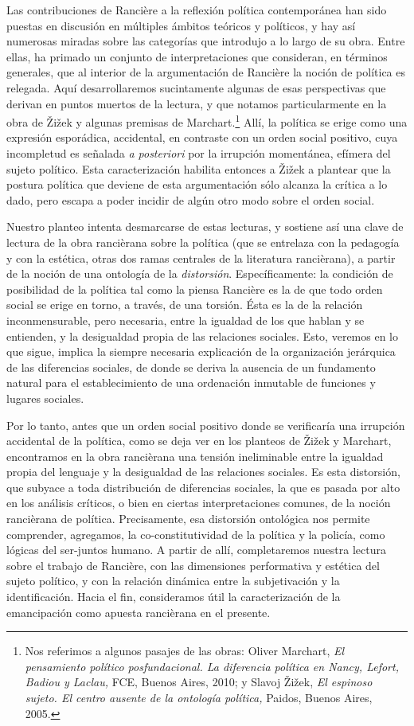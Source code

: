 Las contribuciones de Rancière a la reflexión política contemporánea han sido puestas en discusión en múltiples ámbitos teóricos y políticos, y hay así numerosas miradas sobre las categorías que introdujo a lo largo de su obra. Entre ellas, ha primado un conjunto de interpretaciones que consideran, en términos generales, que al interior de la argumentación de Rancière la noción de política es relegada. Aquí desarrollaremos sucintamente algunas de esas perspectivas que derivan en puntos muertos de la lectura, y que notamos particularmente en la obra de Žižek y algunas premisas de Marchart.\footnote{Nos referimos a algunos pasajes de las obras: Oliver Marchart, \emph{El pensamiento político posfundacional. La diferencia política en Nancy, Lefort, Badiou y Laclau,} FCE, Buenos Aires, 2010; y Slavoj Žižek, \emph{El espinoso sujeto. El centro ausente de la ontología política,} Paidos, Buenos Aires, 2005.} Allí, la política se erige como una expresión esporádica, accidental, en contraste con un orden social positivo, cuya incompletud es señalada \emph{a posteriori} por la irrupción momentánea, efímera del sujeto político. Esta caracterización habilita entonces a Žižek a plantear que la postura política que deviene de esta argumentación sólo alcanza la crítica a lo dado, pero escapa a poder incidir de algún otro modo sobre el orden social.

Nuestro planteo intenta desmarcarse de estas lecturas, y sostiene así una clave de lectura de la obra rancièrana sobre la política (que se entrelaza con la pedagogía y con la estética, otras dos ramas centrales de la literatura rancièrana), a partir de la noción de una ontología de la \emph{distorsión}. Específicamente: la condición de posibilidad de la política tal como la piensa Rancière es la de que todo orden social se erige en torno, a través, de una torsión. Ésta es la de la relación inconmensurable, pero necesaria, entre la igualdad de los que hablan y se entienden, y la desigualdad propia de las relaciones sociales. Esto, veremos en lo que sigue, implica la siempre necesaria explicación de la organización jerárquica de las diferencias sociales, de donde se deriva la ausencia de un fundamento natural para el establecimiento de una ordenación inmutable de funciones y lugares sociales.

Por lo tanto, antes que un orden social positivo donde se verificaría una irrupción accidental de la política, como se deja ver en los planteos de Žižek y Marchart, encontramos en la obra rancièrana una tensión ineliminable entre la igualdad propia del lenguaje y la desigualdad de las relaciones sociales. Es esta distorsión, que subyace a toda distribución de diferencias sociales, la que es pasada por alto en los análisis críticos, o bien en ciertas interpretaciones comunes, de la noción rancièrana de política. Precisamente, esa distorsión ontológica nos permite comprender, agregamos, la co-constitutividad de la política y la policía, como lógicas del ser-juntos humano. A partir de allí, completaremos nuestra lectura sobre el trabajo de Rancière, con las dimensiones performativa y estética del sujeto político, y con la relación dinámica entre la subjetivación y la identificación. Hacia el fin, consideramos útil la caracterización de la emancipación como apuesta rancièrana en el presente.

